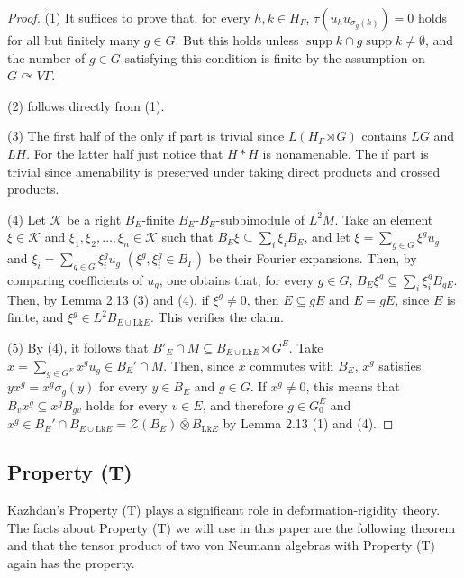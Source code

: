 \documentclass{amsart}
\theoremstyle{definition}
\renewcommand{\subset}{\subseteq}
\begin{document}
\begin{proof}
(1) It suffices to prove that, for every $h, k\in H_{\Gamma}$, $\tau(u_hu_{\sigma_g(k)})=0$ holds for all but finitely many $g\in G$. But this holds unless $\mathop{supp}k\cap g \mathop{supp}k \neq \emptyset$,  
and the number of $g\in G$ satisfying this condition is finite by the assumption on $G\curvearrowright V\Gamma$. 

(2) follows directly from (1). 

(3) The first half of the only if part is trivial since $L(H_{\Gamma}\rtimes G)$ contains $LG$ and $LH$. 
For the latter half just notice that $H\ast H$ is nonamenable. 
The if part is trivial since amenability is preserved under taking direct products and crossed products. 

(4) Let $\mathcal{K}$ be a right $B_E$-finite $B_E$-$B_E$-subbimodule of $L^2M$. Take an element $\xi\in \mathcal{K}$ and $\xi_1,\xi_2, \ldots, \xi_n \in \mathcal{K}$ such that $B_E\xi\subset \sum_i \xi_iB_E$, 
and let $\xi = \sum_{g\in G} \xi^g u_g$ and $\xi_i=\sum_{g\in G} \xi_i^g u_g$ $(\xi^g, \xi_i^g\in B_{\Gamma})$
be their Fourier expansions. Then, by comparing coefficients of $u_g$, one obtains that, for every $g\in G$, 
$B_E\xi^g\subset \sum_i \xi_i^gB_{gE}$. 
Then, by Lemma 2.13 (3) and (4), if $\xi^g\neq 0$, then $E\subset gE$ and $E=gE$, since $E$ is finite, and
$\xi^g\in L^2B_{E\cup \mathrm{Lk}E}$. This verifies the claim. 

(5) By (4), it follows that $B'_E\cap M\subset B_{E\cup \mathrm{Lk}E}\rtimes G^E$. Take $x=\sum_{g\in G^E} x^gu_g\in B_E'\cap M$. Then, since $x$ commutes with $B_E$, $x^g$ satisfies $yx^g=x^g\sigma_g(y)$ for every $y\in B_E$ and $g\in G$. If $x^g\neq 0$, this means that $B_{v}x^g\subset x^g B_{gv}$ holds for every $v\in E$, and therefore $g\in G_0^E$ and $x^g\in B_E'\cap B_{E\cup \mathrm{Lk}E}=\mathcal{Z}(B_E)\overline{\otimes}B_{\mathrm{Lk}E}$ by Lemma 2.13 (1) and (4). 
\end{proof}




\subsection{Property (T)}

Kazhdan's Property (T) plays a significant role in deformation-rigidity theory.  
The facts about Property (T) we will use in this paper are the following theorem
and that the tensor product of two von Neumann algebras with Property (T) again has the property. 
\end{document}
